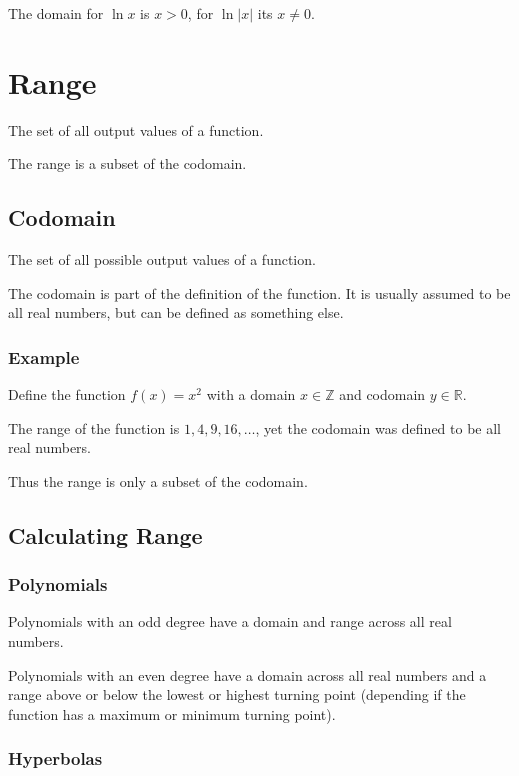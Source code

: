 \documentclass[a4paper,11pt]{article}
\begin{document}
The domain for $\ln{x}$ is $x > 0$, for $\ln{|x|}$ its $x \neq 0$.




\section{Range}

The set of all output values of a function.

The range is a subset of the codomain.


\subsection{Codomain}

The set of all possible output values of a function.

The codomain is part of the definition of the function. It is usually assumed
to be all real numbers, but can be defined as something else.


\subsubsection{Example}

Define the function $f(x) = x^2$ with a domain $x \in \mathbb{Z}$ and codomain
$y \in \mathbb{R}$.

The range of the function is ${1, 4, 9, 16, \ldots}$, yet the codomain was
defined to be all real numbers.

Thus the range is only a subset of the codomain.


\subsection{Calculating Range}

\subsubsection{Polynomials}

Polynomials with an odd degree have a domain and range across all real numbers.

Polynomials with an even degree have a domain across all real numbers and a
range above or below the lowest or highest turning point (depending if the
function has a maximum or minimum turning point).


\subsubsection{Hyperbolas}
\end{document}
